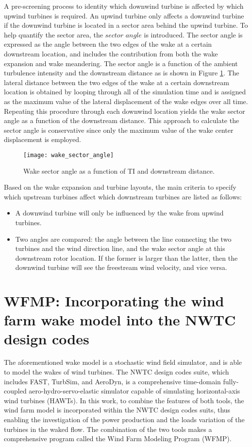 \documentclass{umthesis}
\begin{document}
A pre-screening process to identity which downwind turbine is affected by which upwind turbines is required. An upwind turbine only affects a downwind turbine if the downwind turbine is located in a sector area behind the upwind turbine. To help quantify the sector area, the $sector$ $angle$ is introduced. The sector angle is expressed as the angle between the two edges of the wake at a certain downstream location, and includes the contribution from both the wake expansion and wake meandering. The sector angle is a function of the ambient turbulence intensity and the downstream distance as is shown in Figure \ref{fig:sector angle}. The lateral distance between the two edges of the wake at a certain downstream location is obtained by looping through all of the simulation time and is assigned as the maximum value of the lateral displacement of the wake edges over all time. Repeating this procedure through each downwind location yields the wake sector angle as a function of the downstream distance. This approach to calculate the sector angle is conservative since only the maximum value of the wake center displacement is employed.

\begin{figure}
  \centering
  \texttt{[image: wake\_sector\_angle]}
  \caption{Wake sector angle as a function of TI and downstream distance.}\label{fig:sector angle}
\end{figure}

Based on the wake expansion and turbine layouts, the main criteria to specify which upstream turbines affect which downstream turbines are listed as follows:
\begin{itemize}
  \item A downwind turbine will only be influenced by the wake from upwind turbines.
  \item Two angles are compared: the angle between the line connecting the two turbines and the wind direction line, and the wake sector angle at this downstream rotor location. If the former is larger than the latter, then the downwind turbine will see the freestream wind velocity, and vice versa.
\end{itemize}


\chapter{WFMP: Incorporating the wind farm wake model into the NWTC design codes}\label{chap:DWM_NWTC}
The aforementioned wake model is a stochastic wind field simulator, and is able to model the wakes of wind turbines. The NWTC design codes suite, which includes FAST, TurbSim, and AeroDyn, is a comprehensive time-domain fully-coupled aero-hydro-servo-elastic simulator capable of simulating horizontal-axis wind turbines (HAWTs). In this work, to combine the features of both tools, the wind farm model is incorporated within the NWTC design codes suits, thus enabling the investigation of the power production and the loads variation of the turbines in the waked flow. The combination of the two tools makes a comprehensive program called the Wind Farm Modeling Program (WFMP).
\end{document}
